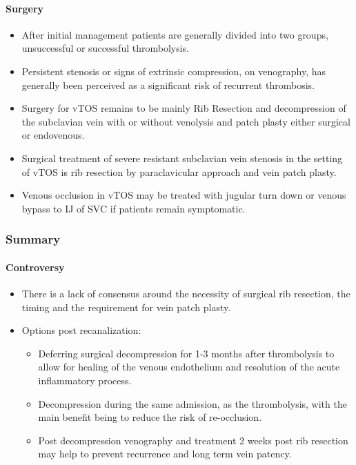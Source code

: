\documentclass[
]{book}
\begin{document}
\hypertarget{surgery}{%
\paragraph{Surgery}\label{surgery}}

\begin{itemize}
\item
  After initial management patients are generally divided into two
  groups, unsuccessful or successful thrombolysis.
\item
  Persistent stenosis or signs of extrinsic compression, on
  venography, has generally been perceived as a significant risk of
  recurrent thrombosis.
\item
  Surgery for vTOS remains to be mainly Rib Resection and
  decompression of the subclavian vein with or without venolysis and
  patch plasty either surgical or endovenous.
\item
  Surgical treatment of severe resistant subclavian vein stenosis in
  the setting of vTOS is rib resection by paraclavicular approach and
  vein patch plasty. \citep{melbyComprehensiveSurgicalManagement2008}
\item
  Venous occlusion in vTOS may be treated with jugular turn down or
  venous bypass to IJ of SVC if patients remain symptomatic.
  \citep{vemuriDiagnosisTreatmentEffortinduced2016}
\end{itemize}

\hypertarget{summary}{%
\subsubsection{Summary}\label{summary}}

\hypertarget{controversy}{%
\paragraph{Controversy}\label{controversy}}

\begin{itemize}
\item
  There is a lack of consensus around the necessity of surgical rib
  resection, the timing and the requirement for vein patch plasty.
\item
  Options post recanalization:

  \begin{itemize}
  \item
    Deferring surgical decompression for 1-3 months after
    thrombolysis to allow for healing of the venous endothelium and
    resolution of the acute inflammatory process.
    \citep{humphries123ThoracicOutlet2019}
  \item
    Decompression during the same admission, as the thrombolysis,
    with the main benefit being to reduce the risk of re-occlusion.
    \citep{humphries123ThoracicOutlet2019, molinaPagetSchroetterSyndromeTreated2007}
  \item
    Post decompression venography and treatment 2 weeks post rib
    resection may help to prevent recurrence and long term vein
    patency. \citep{changRoutineVenographyFollowing2012}
  \end{itemize}
\end{itemize}
\end{document}

